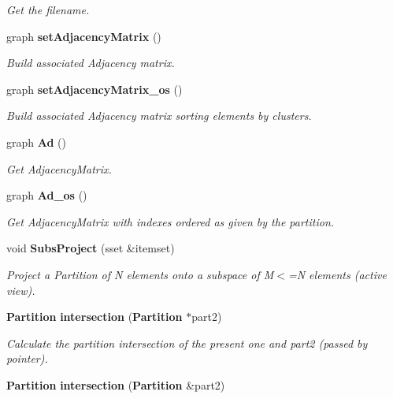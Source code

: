 \begin{CompactItemize}
\begin{CompactList}\small\item\em Get the filename. \item\end{CompactList}\item 
graph {\bf set\-Adjacency\-Matrix} ()\label{classPartition_a56}

\begin{CompactList}\small\item\em Build associated Adjacency matrix. \item\end{CompactList}\item 
graph {\bf set\-Adjacency\-Matrix\_\-os} ()\label{classPartition_a57}

\begin{CompactList}\small\item\em Build associated Adjacency matrix sorting elements by clusters. \item\end{CompactList}\item 
graph {\bf Ad} ()\label{classPartition_a58}

\begin{CompactList}\small\item\em Get Adjacency\-Matrix. \item\end{CompactList}\item 
graph {\bf Ad\_\-os} ()\label{classPartition_a59}

\begin{CompactList}\small\item\em Get Adjacency\-Matrix with indexes ordered as given by the partition. \item\end{CompactList}\item 
void {\bf Subs\-Project} (sset \&itemset)\label{classPartition_a60}

\begin{CompactList}\small\item\em Project a Partition of N elements onto a subspace of M$<$=N elements (active view). \item\end{CompactList}\item 
{\bf Partition} {\bf intersection} ({\bf Partition} $\ast$part2)
\begin{CompactList}\small\item\em Calculate the partition intersection of the present one and part2 (passed by pointer). \item\end{CompactList}\item 
{\bf Partition} {\bf intersection} ({\bf Partition} \&part2)\label{classPartition_a62}


\end{CompactItemize}
